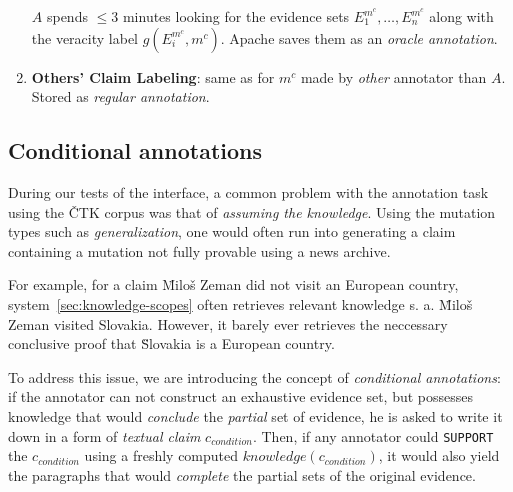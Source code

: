 \begin{enumerate}
        $A$ spends $\leq 3$ minutes looking for the evidence sets  $E^{m^c}_1,\dots,E^{m^c}_n$ along with the veracity label $g(E^{m^c}_i,m^c)$. \textsf{Apache} saves them as an \textit{oracle annotation}.
        \label{t2a}
        
                \item[\itembox{$\textsf{T}_{\textsf{2b}}$}] \textbf{Others' Claim Labeling}: same as \tdvaa{} for $m^c$ made by \textit{other} annotator than $A$. Stored as \textit{regular annotation}.
        \label{t2b}
    
    \end{enumerate}

\subsection{Conditional annotations}
During our tests of the interface, a common problem with the annotation task \tdva{} using the \textsf{ČTK} corpus was that of \textit{assuming the knowledge}. Using the mutation types such as \textit{generalization}, one would often run into generating a claim containing a mutation not fully provable using a news archive.

For example, for a claim \"{Miloš Zeman did not visit an European country}, system~\ref{sec:knowledge-scopes} often retrieves relevant knowledge s. a. \"{Miloš Zeman visited Slovakia}. However, it barely ever retrieves the neccessary conclusive proof that \"{Slovakia is a European country}.

To address this issue, we are introducing the concept of \textit{conditional annotations}: if the annotator can not construct an exhaustive evidence set, but possesses knowledge that would \textit{conclude} the \textit{partial} set of evidence, he is asked to write it down in a form of \textit{textual claim} $c_{condition}$. Then, if any annotator could \texttt{SUPPORT} the $c_{condition}$ using a freshly computed $knowledge(c_{condition})$, it would also yield the paragraphs that would \textit{complete} the partial sets of the original evidence.

